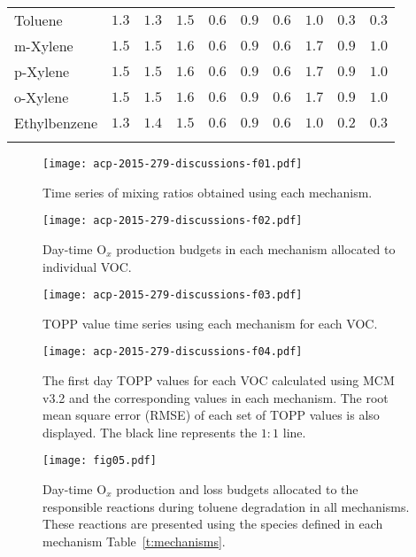 \documentclass[acpd, online, hvmath]{copernicus}
\begin{document}
\begin{table}
{\begin{tabular}{llllllllll}
      Toluene &$1.3$ &$1.3$ &$1.5$ &$0.6$ &$0.9$ &$0.6$ &$1.0$ &$0.3$ &$0.3$ \\
      m-Xylene &$1.5$ &$1.5$ &$1.6$ &$0.6$ &$0.9$ &$0.6$ &$1.7$ &$0.9$ &$1.0$ \\
      p-Xylene &$1.5$ &$1.5$ &$1.6$ &$0.6$ &$0.9$ &$0.6$ &$1.7$ &$0.9$ &$1.0$ \\
      o-Xylene &$1.5$ &$1.5$ &$1.6$ &$0.6$ &$0.9$ &$0.6$ &$1.7$ &$0.9$ &$1.0$ \\
      Ethylbenzene &$1.3$ &$1.4$ &$1.5$ &$0.6$ &$0.9$ &$0.6$ &$1.0$ &$0.2$ &$0.3$ \\
      \bottomhline
    \end{tabular}}
    \label{t:cumulative_TOPPs_per_C}
\end{table}



\begin{figure}[t]
    \texttt{[image: acp-2015-279-discussions-f01.pdf]}
    \caption{Time series of  mixing ratios obtained using
      each mechanism.}
    \label{f:time_series}
\end{figure}
\begin{figure}
    \texttt{[image: acp-2015-279-discussions-f02.pdf]}
    \caption{Day-time O$_{x}$ production budgets in each mechanism
      allocated to individual VOC.}
    \label{f:Ox_tagged_budgets}
\end{figure}
\begin{figure}[t]
  \texttt{[image: acp-2015-279-discussions-f03.pdf]}
  \caption{TOPP value time series using each mechanism for each VOC.}
  \label{f:TOPP_dailies}
\end{figure}
\begin{figure}[t]
  \texttt{[image: acp-2015-279-discussions-f04.pdf]}
  \caption{The first day TOPP values for each VOC calculated using MCM
    v3.2 and the corresponding values in each mechanism. The root mean
    square error (RMSE) of each set of TOPP values is also
    displayed. The black line represents the $1:1$ line.}
    \label{f:first_day}
\end{figure}
\begin{figure}[t]
    \texttt{[image: fig05.pdf]}
    \caption{Day-time O$_{x}$ production and loss budgets allocated
      to the responsible reactions during toluene degradation in all
      mechanisms. These reactions are presented using the species
      defined in each mechanism Table~\ref{t:mechanisms}.}
    \label{f:toluene_Ox}
\end{figure}
\end{document}

